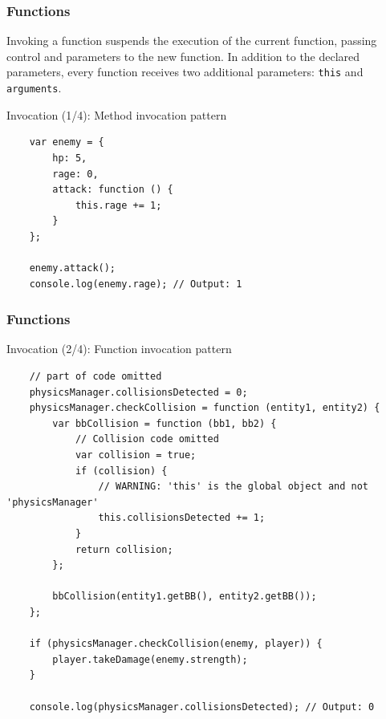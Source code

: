 \begin{frame}[fragile]
  \frametitle{Functions}

  Invoking a function suspends the execution of the current function, passing control and parameters to the new function. In addition to the declared parameters, every function receives two additional parameters: \texttt{this} and \texttt{arguments}.

  \pause

  \begin{block}{Invocation (1/4): Method invocation pattern}
    {\scriptsize
    \begin{verbatim}
    var enemy = {
        hp: 5,
        rage: 0,
        attack: function () {
            this.rage += 1;
        }
    };

    enemy.attack();
    console.log(enemy.rage); // Output: 1
    \end{verbatim}
    }
  \end{block}
\end{frame}

\begin{frame}[fragile]
  \frametitle{Functions}

  \begin{block}{Invocation (2/4): Function invocation pattern}
    {\tiny
    \begin{verbatim}
    // part of code omitted
    physicsManager.collisionsDetected = 0;
    physicsManager.checkCollision = function (entity1, entity2) {
        var bbCollision = function (bb1, bb2) {
            // Collision code omitted
            var collision = true;
            if (collision) {
                // WARNING: 'this' is the global object and not 'physicsManager'
                this.collisionsDetected += 1;
            }
            return collision;
        };

        bbCollision(entity1.getBB(), entity2.getBB());
    };

    if (physicsManager.checkCollision(enemy, player)) {
        player.takeDamage(enemy.strength);
    }

    console.log(physicsManager.collisionsDetected); // Output: 0
    \end{verbatim}
    }
  \end{block}
\end{frame}

